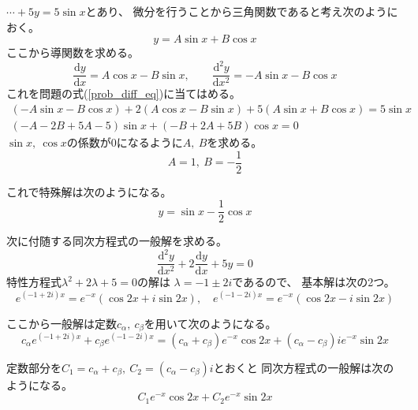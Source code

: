 \documentclass[12pt,b5paper]{ltjsarticle}
\begin{document}
\begin{enumerate}
      $\cdots + 5y =5\sin{x}$とあり、
      微分を行うことから三角関数であると考え次のようにおく。
      \begin{equation}
       y=A\sin x + B\cos x
      \end{equation}
      ここから導関数を求める。
      \begin{equation}
       \frac{\mathrm{d}y}{\mathrm{d}x}
        = A\cos x -B\sin x
        , \qquad
        \frac{\mathrm{d}^2y}{\mathrm{d}x^2}
        = -A\sin x -B\cos x
      \end{equation}
      これを問題の式(\ref{prob_diff_eq})に当てはめる。
      \begin{gather}
       (-A\sin x -B\cos x) + 2(A\cos x -B\sin x)
       +5(A\sin x + B\cos x) = 5\sin x\\
       (-A-2B+5A-5)\sin x +(-B+2A+5B)\cos x =0
      \end{gather}
      $\sin x,\ \cos x$の係数が0になるように$A,\ B$を求める。
      \begin{equation}
       A= 1, \ B =-\frac{1}{2}
      \end{equation}

      これで特殊解は次のようになる。
      \begin{equation}
       y=\sin x -\frac{1}{2}\cos x
        \label{kai_toku}
      \end{equation}

      次に付随する同次方程式の一般解を求める。
      \begin{equation}
       \frac{\mathrm{d}^2y}{\mathrm{d}x^2}
        +2 \frac{\mathrm{d}y}{\mathrm{d}x}
        + 5y = 0
      \end{equation}
      特性方程式$\lambda^2+2\lambda+5=0$の解は
      $\lambda=-1\pm2i$であるので、
      基本解は次の2つ。
      \begin{equation}
       e^{(-1+2i)x}=e^{-x}(\cos 2x +i\sin 2x),
        \quad
        e^{(-1-2i)x}=e^{-x}(\cos 2x -i\sin 2x)
      \end{equation}

      ここから一般解は定数$c_{\alpha},\ c_{\beta}$を用いて次のようになる。
      \begin{equation}
       c_{\alpha}e^{(-1+2i)x} + c_{\beta}e^{(-1-2i)x}
        = (c_{\alpha}+c_{\beta})e^{-x}\cos 2x
        +(c_{\alpha}-c_{\beta})ie^{-x}\sin 2x
      \end{equation}

      定数部分を$C_1=c_{\alpha}+c_{\beta}, \ C_2=(c_{\alpha}-c_{\beta})i$とおくと
      同次方程式の一般解は次のようになる。
      \begin{equation}
       C_{1}e^{-x}\cos 2x + C_{2}e^{-x}\sin 2x
        \label{kai_ippan}
      \end{equation}



\end{enumerate}
\end{document}
